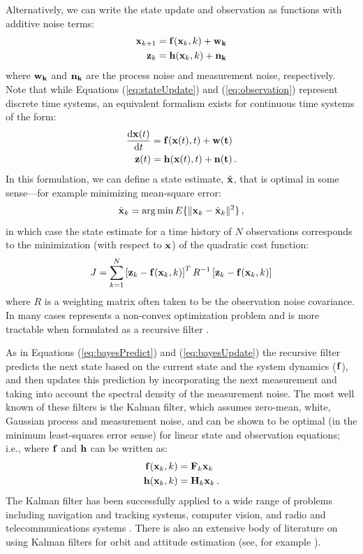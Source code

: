 Alternatively, we can write the state update and observation as functions with additive noise terms:
\begin{align}
\mathbf x_{k+1}& = \mathbf f(\mathbf x_k,k) + \bf w_k \label{eq:stateUpdate}\\
\mathbf z_k &= \mathbf h(\mathbf x_k,k) + \bf n_k \label{eq:observation}
\end{align}
where $\bf w_k$ and $\bf n_k$ are the process noise and measurement noise, respectively.  Note that while Equations (\ref{eq:stateUpdate}) and (\ref{eq:observation}) represent discrete time systems, an equivalent formalism exists for continuous time systems of the form:
\begin{align}
\frac{\mathrm{d}\mathbf x(t)}{\mathrm{d}t}  &= \mathbf f(\mathbf x(t),t) + \bf w(t) \label{eq:stateUpdateCont}\\
\mathbf z(t) &= \mathbf h(\mathbf x(t),t) + \bf n(t) \label{eq:observationCont} \,.
\end{align}
In this formulation, we can define a state estimate, $\hat{\mathbf x}$, that is optimal in some sense---for example minimizing mean-square error:
\begin{equation}
\hat{\mathbf x}_k = \arg\min E\{\Vert \mathbf x_k - \hat{\mathbf x}_k\Vert^2\} \,,
\end{equation}
in which case the state estimate for a time history of $N$ observations corresponds to the minimization (with respect to $\mathbf x$) of the quadratic cost function:
\begin{equation} \label{eq:filteringCost}
J = \sum_{k=1}^N \left[\mathbf z_k - \mathbf f(\mathbf x_k,k) \right]^T R^{-1}\left[\mathbf z_k -\mathbf f(\mathbf x_k,k) \right]
\end{equation}
where $R$ is a weighting matrix often taken to be the observation noise covariance.  In many cases  represents a non-convex optimization problem and is more tractable when formulated as a recursive filter \citep{crassidis2004}.

As in Equations (\ref{eq:bayesPredict}) and (\ref{eq:bayesUpdate}) the recursive filter predicts the next state based on the current state and the system dynamics ($\mathbf f$), and then updates this prediction by incorporating the next measurement and taking into account the spectral density of the measurement noise.  The most well known of these filters is the Kalman filter, which assumes zero-mean, white, Gaussian process and measurement noise, and can be shown to be optimal (in the minimum least-squares error sense) for linear state and observation equations; i.e., where $\mathbf f $ and $\mathbf h$ can be written as:
\begin{align}
\mathbf f(\mathbf x_k,k) &= \mathbf F_k \mathbf x_k \label{eq:linStateUpdate}\\
\mathbf h(\mathbf x_k,k) &= \mathbf H_k \mathbf x_k \,.
\end{align}
The Kalman filter has been successfully applied to a wide range of problems including navigation and tracking systems, computer vision, and radio and telecommunications systems \citep{stengel1994optimal,crassidis2004}.  There is also an extensive body of literature on using Kalman filters for orbit and attitude estimation (see, for example \citet{spilker1996global}).


